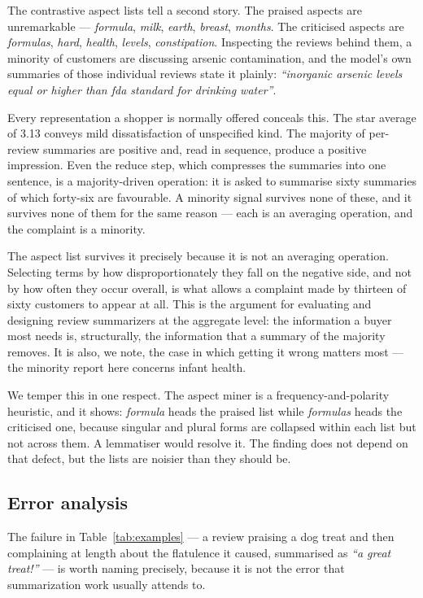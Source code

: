 The contrastive aspect lists tell a second story. The praised aspects are
unremarkable --- \emph{formula}, \emph{milk}, \emph{earth}, \emph{breast},
\emph{months}. The criticised aspects are \emph{formulas}, \emph{hard},
\emph{health}, \emph{levels}, \emph{constipation}. Inspecting the reviews
behind them, a minority of customers are discussing arsenic contamination, and
the model's own summaries of those individual reviews state it plainly:
\emph{``inorganic arsenic levels equal or higher than fda standard for drinking
water''}.

Every representation a shopper is normally offered conceals this. The star
average of 3.13 conveys mild dissatisfaction of unspecified kind. The majority
of per-review summaries are positive and, read in sequence, produce a positive
impression. Even the reduce step, which compresses the summaries into one
sentence, is a majority-driven operation: it is asked to summarise sixty
summaries of which forty-six are favourable. A minority signal survives none of
these, and it survives none of them for the same reason --- each is an
averaging operation, and the complaint is a minority.

The aspect list survives it precisely because it is not an averaging operation.
Selecting terms by how disproportionately they fall on the negative side, and
not by how often they occur overall, is what allows a complaint made by
thirteen of sixty customers to appear at all. This is the argument for
evaluating and designing review summarizers at the aggregate level: the
information a buyer most needs is, structurally, the information that a
summary of the majority removes. It is also, we note, the case in which getting
it wrong matters most --- the minority report here concerns infant health.

We temper this in one respect. The aspect miner is a frequency-and-polarity
heuristic, and it shows: \emph{formula} heads the praised list while
\emph{formulas} heads the criticised one, because singular and plural forms are
collapsed within each list but not across them. A lemmatiser would resolve it.
The finding does not depend on that defect, but the lists are noisier than they
should be.

\subsection{Error analysis}

The failure in Table~\ref{tab:examples} --- a review praising a dog treat and
then complaining at length about the flatulence it caused, summarised as
\emph{``a great treat!''} --- is worth naming precisely, because it is not the
error that summarization work usually attends to.

